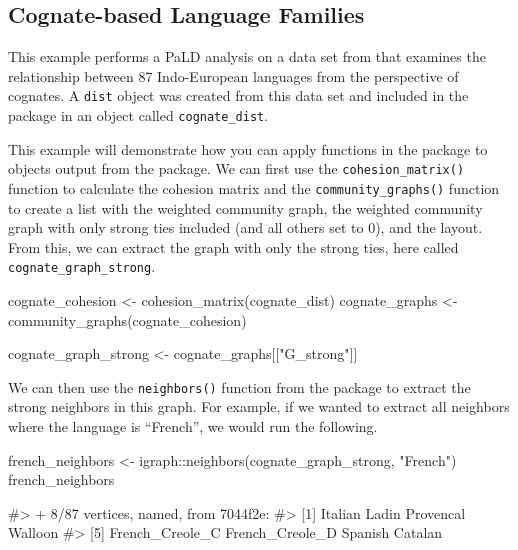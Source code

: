 \hypertarget{cognate-based-language-families}{%
\subsection{Cognate-based Language
Families}\label{cognate-based-language-families}}

This example performs a PaLD analysis on a data set from \citet{dyen92}
that examines the relationship between 87 Indo-European languages from
the perspective of cognates. A \texttt{dist} object was created from
this data set and included in the  package in an object
called \texttt{cognate\_dist}.

This example will demonstrate how you can apply functions in the
 package to objects output from the 
package. We can first use the \texttt{cohesion\_matrix()} function to
calculate the cohesion matrix and the \texttt{community\_graphs()}
function to create a list with the weighted community graph, the
weighted community graph with only strong ties included (and all others
set to 0), and the layout. From this, we can extract the graph with only
the strong ties, here called \texttt{cognate\_graph\_strong}.

\begin{Schunk}
\begin{Sinput}
cognate_cohesion <- cohesion_matrix(cognate_dist)
cognate_graphs <- community_graphs(cognate_cohesion)

cognate_graph_strong <- cognate_graphs[["G_strong"]]
\end{Sinput}
\end{Schunk}

We can then use the \texttt{neighbors()} function from the
 package to extract the strong neighbors in this graph.
For example, if we wanted to extract all neighbors where the language is
``French'', we would run the following.

\begin{Schunk}
\begin{Sinput}
french_neighbors <- igraph::neighbors(cognate_graph_strong, "French")
french_neighbors
\end{Sinput}
\begin{Soutput}
#> + 8/87 vertices, named, from 7044f2e:
#> [1] Italian         Ladin           Provencal       Walloon        
#> [5] French_Creole_C French_Creole_D Spanish         Catalan
\end{Soutput}
\end{Schunk}

